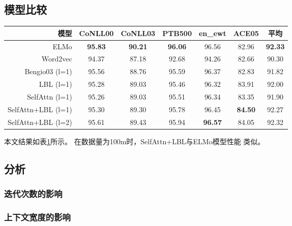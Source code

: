 
\subsection{模型比较}
\begin{table}[t]
	\centering
	\label{tbl:elmo:res}
	\begin{tabular}{r cccccc}
		\hline
		模型 & CoNLL00 & CoNLL03 & PTB500 & en\_ewt & ACE05 & 平均 \\
		\hline
		ELMo & \bf 95.83 & \bf 90.21 & \bf 96.06 & 96.56 & 82.96 &\bf 92.33 \\
		\hdashline
		Word2vec & 94.37 & 87.18 & 92.68 & 94.26 & 82.66 & 90.30 \\
		\hdashline
		Bengio03 (l=1) & 95.56 & 88.76 & 95.59 & 96.37 & 82.83 & 91.82 \\
		LBL (l=1)& 95.28 & 89.03 & 95.46 & 96.32 & 83.91 & 92.00 \\
		SelfAttn (l=1) & 95.26 & 89.03 & 95.51 & 96.34 & 83.35 & 91.90 \\
		SelfAttn+LBL (l=1) & 95.30 & 89.30 & 95.78 & 96.45 &\bf 84.50 & 92.27 \\
		SelfAttn+LBL (l=2) & 95.61 & 89.43 & 95.94 &\bf 96.57 & 84.05 & 92.32 \\
		\hline
	\end{tabular}
\end{table}

本文结果如表\ref{tbl:elmo:res}所示。
在数据量为100m时，SelfAttn+LBL与ELMo模型性能
类似。

\subsection{分析}

\subsubsection{迭代次数的影响}

\subsubsection{上下文宽度的影响}

